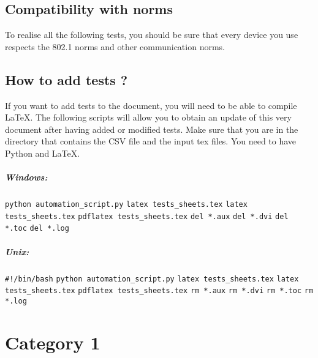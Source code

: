 \documentclass[oneside]{book}
\begin{document}
\section{Compatibility with norms}
To realise all the following tests, you should be sure that every device you use respects the 802.1 norms and other communication norms. 
\section{How to add tests ?}
If you want to add tests to the document, you will need to be able to compile LaTeX. 
\newline
The following scripts will allow you to obtain an update of this very document after having added or modified tests. Make sure that you are in the directory that contains the CSV file and the input tex files. You need to have Python and LaTeX.

\paragraph{Windows: }
\verb|python automation_script.py| 
\newline
\verb|latex tests_sheets.tex|
\newline
\verb|latex tests_sheets.tex|
\newline
\verb|pdflatex tests_sheets.tex|
\newline
\verb|del *.aux|
\newline
\verb|del *.dvi|
\newline
\verb|del *.toc|
\newline
\verb|del *.log|
\paragraph{Unix: }
\verb|#!/bin/bash|
\newline
\verb|python automation_script.py| 
\newline
\verb|latex tests_sheets.tex|
\newline
\verb|latex tests_sheets.tex|
\newline
\verb|pdflatex tests_sheets.tex|
\newline
\verb|rm *.aux|
\newline
\verb|rm *.dvi|
\newline
\verb|rm *.toc|
\newline
\verb|rm *.log|
\chapter{Category 1}
\end{document}
